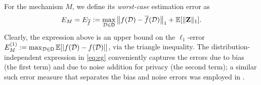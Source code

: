 
For the mechanism $M$, we define its \emph{worst-case} estimation error as
\begin{equation}
	\label{eq:eg}
	E_M = E_{\overline{f}}:= \max_{\mathcal{D}\in \mathsf{D}} \big \lVert f(\mathcal{D}) - \overline{f}(\mathcal{D}) \big\rVert_1 + \mathbb{E}[\lVert{\mathbf{Z}}\rVert_1].
\end{equation}
Clearly, the expression above is an upper bound on the $\ell_1$-error $E^{(1)}_M:= \max_{\mathcal{D}\in \mathsf{D}} \mathbb{E}[|f(\mathcal{D})-f(\mathcal{D})|]$, via the triangle inequality. The distribution-independent expression in \eqref{eq:eg} conveniently captures the errors due to bias (the first term) and due to noise addition for privacy (the second term); a similar such error measure that separates the bias and noise errors was employed in \cite{amin}. 
